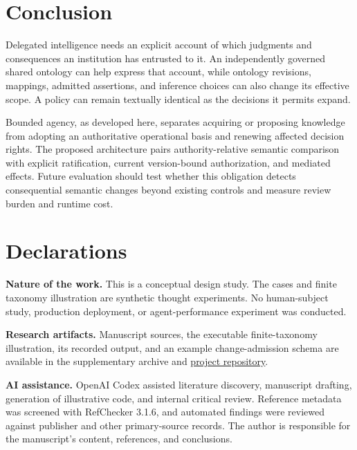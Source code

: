 \documentclass[
  english,
  12pt,
  a4paper,
  preprint,
  numbers,
  nopreprintline]{elsarticle}
\begin{document}
\section{Conclusion}\label{conclusion}

Delegated intelligence needs an explicit account of which judgments and
consequences an institution has entrusted to it. An independently
governed shared ontology can help express that account, while ontology
revisions, mappings, admitted assertions, and inference choices can also
change its effective scope. A policy can remain textually identical as
the decisions it permits expand.

Bounded agency, as developed here, separates acquiring or proposing
knowledge from adopting an authoritative operational basis and renewing
affected decision rights. The proposed architecture pairs
authority-relative semantic comparison with explicit ratification,
current version-bound authorization, and mediated effects. Future
evaluation should test whether this obligation detects consequential
semantic changes beyond existing controls and measure review burden and
runtime cost.

\section*{Declarations}\label{declarations}

\textbf{Nature of the work.} This is a conceptual design study. The
cases and finite taxonomy illustration are synthetic thought
experiments. No human-subject study, production deployment, or
agent-performance experiment was conducted.

\textbf{Research artifacts.} Manuscript sources, the executable
finite-taxonomy illustration, its recorded output, and an example
change-admission schema are available in the supplementary archive and
\href{https://github.com/prosessleder/bounded-agency}{project
repository}.

\textbf{AI assistance.} OpenAI Codex assisted literature discovery,
manuscript drafting, generation of illustrative code, and internal
critical review. Reference metadata was screened with RefChecker 3.1.6,
and automated findings were reviewed against publisher and other
primary-source records. The author is responsible for the manuscript's
content, references, and conclusions.
\end{document}
